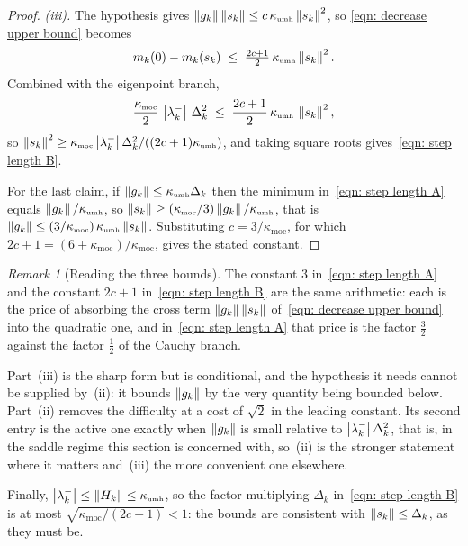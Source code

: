 \documentclass[11pt]{article}
\theoremstyle{plain}
\theoremstyle{definition}
\theoremstyle{remark}
\newtheorem{remark}[theorem]{Remark}
\numberwithin{equation}{section}
\newcommand*\mykappa[1]{\kappa_{\scriptscriptstyle\text{#1}}}
\begin{document}
\begin{proof}
    \emph{(iii).} The hypothesis gives
    $\norm{g_k}\norm{s_k} \leq c\,\mykappa{umh}\norm{s_k}^2$, so
    \eqref{eqn: decrease upper bound} becomes
    \begin{equation*}
      m_k(0) - m_k(s_k) \;\leq\; \tfrac{2c+1}{2}\,\mykappa{umh}\norm{s_k}^2 .
    \end{equation*}
    Combined with the eigenpoint branch,
    \begin{equation*}
        \frac{\mykappa{moc}}{2}\,\abs{\lambda_k^-}\,\Delta_k^2
        \;\leq\; \frac{2c+1}{2}\,\mykappa{umh}\,\norm{s_k}^2 ,
    \end{equation*}
    so $\norm{s_k}^2 \geq \mykappa{moc}\abs{\lambda_k^-}\Delta_k^2/((2c+1)\mykappa{umh})$, and
    taking square roots gives~\eqref{eqn: step length B}.

    For the last claim, if $\norm{g_k} \leq \mykappa{umh}\Delta_k$ then the minimum
    in~\eqref{eqn: step length A} equals $\norm{g_k}/\mykappa{umh}$, so
    $\norm{s_k} \geq (\mykappa{moc}/3)\norm{g_k}/\mykappa{umh}$, that is
    $\norm{g_k} \leq (3/\mykappa{moc})\,\mykappa{umh}\norm{s_k}$. Substituting
    $c = 3/\mykappa{moc}$, for which $2c+1 = (6+\mykappa{moc})/\mykappa{moc}$, gives the stated
    constant.
\end{proof}

\begin{remark}[Reading the three bounds]
\label{rem: step length reading}
    The constant $3$ in~\eqref{eqn: step length A} and the constant $2c+1$
    in~\eqref{eqn: step length B} are the same arithmetic: each is the price of absorbing the cross
    term $\left \lVert g_k \right \rVert\left \lVert s_k \right \rVert$ of~\eqref{eqn: decrease upper bound} into the quadratic one, and
    in~\eqref{eqn: step length A} that price is the factor $\tfrac32$ against the factor $\tfrac12$
    of the Cauchy branch.

    Part~(iii) is the sharp form but is conditional, and the hypothesis it needs cannot be supplied
    by~(ii): it bounds $\left \lVert g_k \right \rVert$ by the very quantity being bounded below. Part~(ii) removes the
    difficulty at a cost of $\sqrt2$ in the leading constant. Its second entry is the active one
    exactly when $\left \lVert g_k \right \rVert$ is small relative to $\left \vert \lambda_k^- \right \vert\Delta_k^2$, that is, in the
    saddle regime this section is concerned with, so~(ii) is the stronger statement where it
    matters and~(iii) the more convenient one elsewhere.

    Finally, $\abs{\lambda_k^-} \leq \norm{H_k} \leq \mykappa{umh}$, so the factor multiplying
    $\Delta_k$ in~\eqref{eqn: step length B} is at most $\sqrt{\mykappa{moc}/(2c+1)} < 1$: the
    bounds are consistent with $\left \lVert s_k \right \rVert \leq \Delta_k$, as they must be.
\end{remark}
\end{document}
